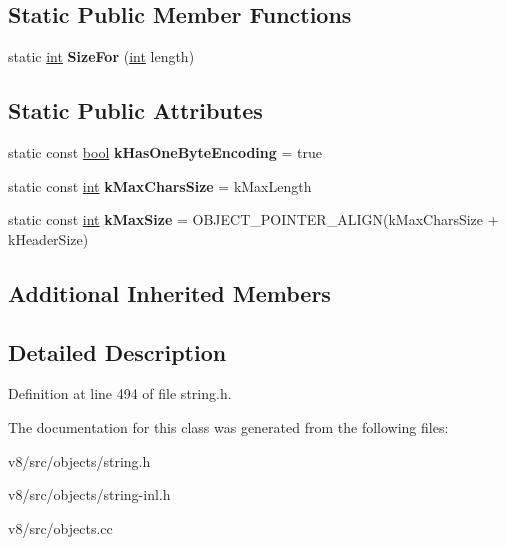 \subsection*{Static Public Member Functions}
\begin{DoxyCompactItemize}
\item 
\mbox{\label{classv8_1_1internal_1_1SeqOneByteString_a8c149d283d3bc8e22fd909bb6687da7f}} 
static \mbox{\hyperlink{classint}{int}} {\bfseries Size\+For} (\mbox{\hyperlink{classint}{int}} length)
\end{DoxyCompactItemize}
\subsection*{Static Public Attributes}
\begin{DoxyCompactItemize}
\item 
\mbox{\label{classv8_1_1internal_1_1SeqOneByteString_a3f47a8d6c036b7cffa6ea7c1133a56d4}} 
static const \mbox{\hyperlink{classbool}{bool}} {\bfseries k\+Has\+One\+Byte\+Encoding} = true
\item 
\mbox{\label{classv8_1_1internal_1_1SeqOneByteString_a8402f0e4744f40810cc4c570759041dc}} 
static const \mbox{\hyperlink{classint}{int}} {\bfseries k\+Max\+Chars\+Size} = k\+Max\+Length
\item 
\mbox{\label{classv8_1_1internal_1_1SeqOneByteString_af5744767fa5422c6d3a5b046f5f7090a}} 
static const \mbox{\hyperlink{classint}{int}} {\bfseries k\+Max\+Size} = O\+B\+J\+E\+C\+T\+\_\+\+P\+O\+I\+N\+T\+E\+R\+\_\+\+A\+L\+I\+GN(k\+Max\+Chars\+Size + k\+Header\+Size)
\end{DoxyCompactItemize}
\subsection*{Additional Inherited Members}


\subsection{Detailed Description}


Definition at line 494 of file string.\+h.



The documentation for this class was generated from the following files\+:\begin{DoxyCompactItemize}
\item 
v8/src/objects/string.\+h\item 
v8/src/objects/string-\/inl.\+h\item 
v8/src/objects.\+cc\end{DoxyCompactItemize}

